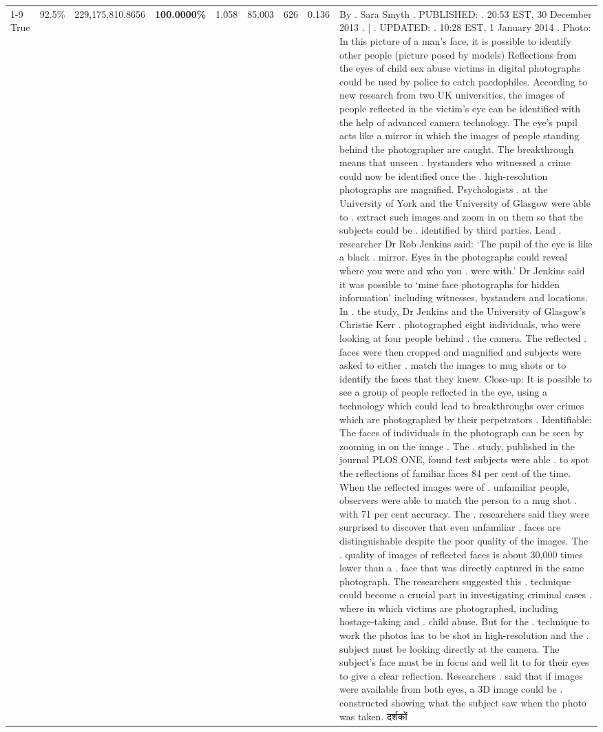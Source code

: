 \begin{table}[H]
\begin{tabular}{lllrlllll}
\cline{1-9} \cline{2-9}
True & 92.5\% & 229,175,810.8656 & \bfseries \color{red} 100.0000\% & 1.058 & 85.003 & 626 & 0.136 & By . Sara Smyth . PUBLISHED: . 20:53 EST, 30 December 2013 . | . UPDATED: . 10:28 EST, 1 January 2014 . Photo: In this picture of a man's face, it is possible to identify other people (picture posed by models) Reflections from the eyes of child sex abuse victims in digital photographs could be used by police to catch paedophiles. According to new research from two UK universities, the images of people reflected in the victim's eye can be identified with the help of advanced camera technology. The eye's pupil acts like a mirror in which the images of people standing behind the photographer are caught. The breakthrough means that unseen . bystanders who witnessed a crime could now be identified once the . high-resolution photographs are magnified. Psychologists . at the University of York and the University of Glasgow were able to . extract such images and zoom in on them so that the subjects could be . identified by third parties. Lead . researcher Dr Rob Jenkins said: ‘The pupil of the eye is like a black . mirror. Eyes in the photographs could reveal where you were and who you . were with.' Dr Jenkins said it was possible to ‘mine face photographs for hidden information' including witnesses, bystanders and locations. In . the study, Dr Jenkins and the University of Glasgow's Christie Kerr . photographed eight individuals, who were looking at four people behind . the camera. The reflected . faces were then cropped and magnified and subjects were asked to either . match the images to mug shots or to identify the faces that they knew. Close-up: It is possible to see a group of people reflected in the eye, using a technology which could lead to breakthroughs over crimes which are photographed by their perpetrators . Identifiable: The faces of individuals in the photograph can be seen by zooming in on the image . The . study, published in the journal PLOS ONE, found test subjects were able . to spot the reflections of familiar faces 84 per cent of the time. When the reflected images were of . unfamiliar people, observers were able to match the person to a mug shot . with 71 per cent accuracy. The . researchers said they were surprised to discover that even unfamiliar . faces are distinguishable despite the poor quality of the images. The . quality of images of reflected faces is about 30,000 times lower than a . face that was directly captured in the same photograph. The researchers suggested this . technique could become a crucial part in investigating criminal cases . where in which victims are photographed, including hostage-taking and . child abuse. But for the . technique to work the photos has to be shot in high-resolution and the . subject must be looking directly at the camera. The subject's face must be in focus and well lit to for their eyes to give a clear reflection. Researchers . said that if images were available from both eyes, a 3D image could be . constructed showing what the subject saw when the photo was taken. दर्शकों \\

\end{tabular}
\end{table}
